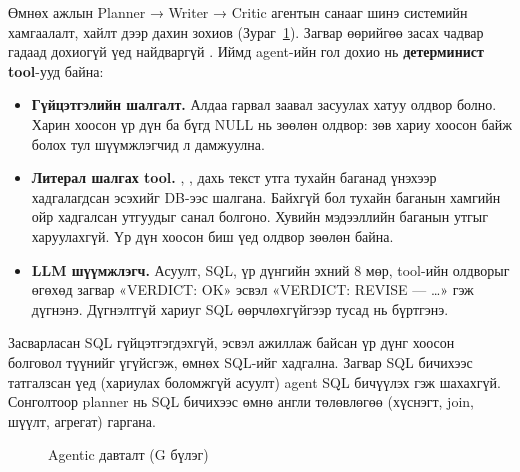 Өмнөх ажлын Planner → Writer → Critic агентын санааг шинэ системийн хамгаалалт, хайлт дээр дахин зохиов
(Зураг~\ref{fig:agent}). Загвар өөрийгөө засах чадвар гадаад дохиогүй үед найдваргүй
\cite{huang_2024_self_correct}. Иймд agent-ийн гол дохио нь \textbf{детерминист tool}-ууд байна:
\begin{itemize}
  \item \textbf{Гүйцэтгэлийн шалгалт.} Алдаа гарвал заавал засуулах хатуу олдвор болно. Харин хоосон үр дүн ба бүгд NULL нь
        зөөлөн олдвор: зөв хариу хоосон байж болох тул шүүмжлэгчид л дамжуулна.
  \item \textbf{Литерал шалгах tool.} , ,  дахь текст утга тухайн баганад үнэхээр хадгалагдсан
        эсэхийг DB-ээс шалгана. Байхгүй бол тухайн баганын хамгийн ойр хадгалсан утгуудыг санал болгоно. Хувийн
        мэдээллийн баганын утгыг харуулахгүй. Үр дүн хоосон биш үед олдвор зөөлөн байна.
  \item \textbf{LLM шүүмжлэгч.} Асуулт, SQL, үр дүнгийн эхний 8 мөр, tool-ийн олдворыг өгөхөд загвар
        «VERDICT: OK» эсвэл «VERDICT: REVISE --- …» гэж дүгнэнэ. Дүгнэлтгүй хариуг SQL өөрчлөхгүйгээр
        тусад нь бүртгэнэ.
\end{itemize}
Засварласан SQL гүйцэтгэгдэхгүй, эсвэл ажиллаж байсан үр дүнг хоосон болговол түүнийг үгүйсгэж, өмнөх SQL-ийг
хадгална. Загвар SQL бичихээс татгалзсан үед (хариулах боломжгүй асуулт) agent SQL бичүүлэх гэж шахахгүй.
Сонголтоор planner нь SQL бичихээс өмнө англи төлөвлөгөө (хүснэгт, join, шүүлт, агрегат) гаргана.

\begin{figure}[htbp]
\centering
{}
\caption{Agentic давталт (G бүлэг)}
\label{fig:agent}
\end{figure}

